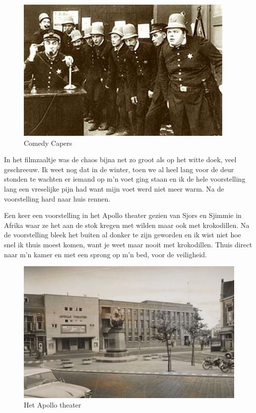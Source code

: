 \documentclass[12pt,twoside, openright]{memoir}
\begin{document}
\begin{figure}
\includegraphics[width=\textwidth]{img/ch5/ComedyCapers}
\caption*{\footnotesize Comedy Capers}
\end{figure}

In het filmzaaltje was de chaos bijna net zo groot als op het witte doek, veel geschreeuw. Ik weet nog dat in de winter, toen we al heel lang voor de deur stonden te wachten er iemand op m’n voet ging staan en ik de hele voorstelling lang een vreselijke pijn had want mijn voet werd niet meer warm. Na de voorstelling hard naar huis rennen.

Een keer een voorstelling in het Apollo theater gezien van Sjors en Sjimmie in Afrika waar ze het aan de stok kregen met wilden maar ook met krokodillen. Na de voorstelling bleek het buiten al donker te zijn geworden en ik wist niet hoe snel ik thuis moest komen, want je weet maar nooit met krokodillen. Thuis direct naar m’n kamer en met een sprong op m’n bed, voor de veiligheid. 

\begin{figure}
\includegraphics[width=\textwidth]{img/ch5/apollo}
\caption*{\footnotesize Het Apollo theater}
\end{figure}
\end{document}
